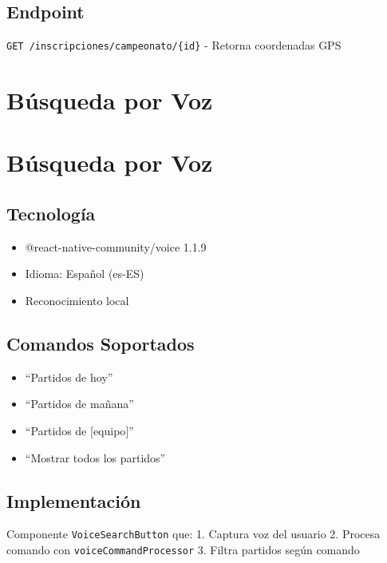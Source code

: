 \documentclass[
  spanish,
  11pt,
  letterpaper,
]{book}
\providecommand{\tightlist}{%
  \setlength{\itemsep}{0pt}\setlength{\parskip}{0pt}}
\begin{document}
\section{Endpoint}\label{endpoint}

\texttt{GET\ /inscripciones/campeonato/\{id\}} - Retorna coordenadas GPS

\chapter{Búsqueda por Voz}\label{buxfasqueda-por-voz}

\chapter{Búsqueda por Voz}\label{buxfasqueda-por-voz-1}

\section{Tecnología}\label{tecnologuxeda-2}

\begin{itemize}
\tightlist
\item
  @react-native-community/voice 1.1.9
\item
  Idioma: Español (es-ES)
\item
  Reconocimiento local
\end{itemize}

\section{Comandos Soportados}\label{comandos-soportados}

\begin{itemize}
\tightlist
\item
  ``Partidos de hoy''
\item
  ``Partidos de mañana''
\item
  ``Partidos de {[}equipo{]}''
\item
  ``Mostrar todos los partidos''
\end{itemize}

\section{Implementación}\label{implementaciuxf3n}

Componente \texttt{VoiceSearchButton} que: 1. Captura voz del usuario 2.
Procesa comando con \texttt{voiceCommandProcessor} 3. Filtra partidos
según comando
\end{document}
